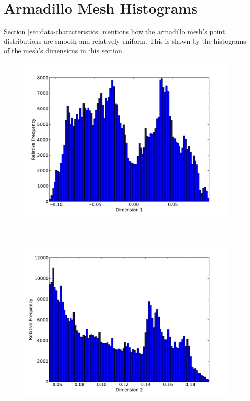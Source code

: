 \newpage

\section{Armadillo Mesh Histograms}
\label{sec:armadillo-histograms}

Section \ref{sec:data-characteristics} mentions how the armadillo mesh's point distributions are smooth and relatively uniform. This is shown by the histograms of the mesh's dimensions in this section.

\begin{figure}[h]
	\begin{center}
		\begin{subfloat}[Dimension 1]{%
			\includegraphics[scale=0.36]{figures/histograms/armadillo_unique_0.pdf}
		}
		\end{subfloat}~
		\begin{subfloat}[Dimension 2]{%
			\includegraphics[scale=0.36]{figures/histograms/armadillo_unique_1.pdf}
		}
		\end{subfloat}~


\end{center}
\end{figure}
